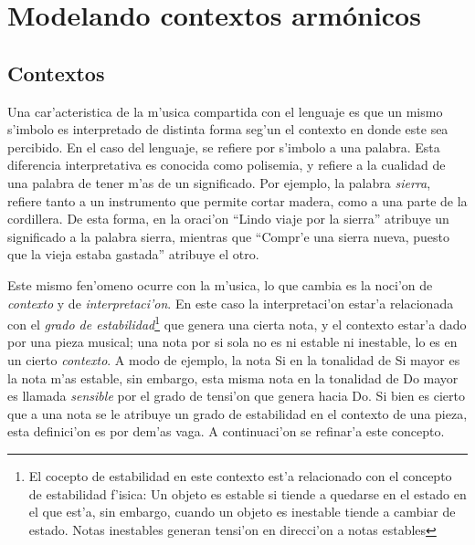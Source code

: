 \pagebreak
\section{Modelando contextos arm\'onicos}
\label{sec:harmonic_contexts}
\subsection{Contextos}
Una car'acteristica de la m'usica compartida con el lenguaje es que un mismo s'imbolo es interpretado de distinta forma seg'un el contexto
en donde este sea percibido. En el caso del lenguaje, se refiere por s'imbolo a una palabra. Esta diferencia interpretativa es conocida 
como polisemia, y refiere a la cualidad de una palabra de tener m'as de un significado. Por ejemplo, la palabra \emph{sierra}, refiere
tanto a un instrumento que permite cortar madera, como a una parte de la cordillera. De esta forma, en la oraci'on 
``Lindo viaje por la sierra'' atribuye un significado a la palabra sierra, mientras que ``Compr'e una sierra nueva, puesto que la vieja 
estaba gastada'' atribuye el otro. 

Este mismo fen'omeno ocurre con la m'usica, lo que cambia es la noci'on de \emph{contexto} y de \emph{interpretaci'on}. En este caso
la interpretaci'on estar'a relacionada con el \emph{grado de estabilidad}\footnote{El cocepto de estabilidad en este contexto est'a relacionado
con el concepto de estabilidad f'isica: Un objeto es estable si tiende a quedarse en el estado en el que est'a, sin embargo, cuando un objeto
es inestable tiende a cambiar de estado. Notas inestables generan tensi'on en direcci'on a notas estables} que genera una cierta nota, 
y el contexto estar'a dado por una pieza musical; una nota por si sola no es ni estable ni inestable, lo es en un cierto \emph{contexto}. 
A modo de ejemplo, la nota Si en la tonalidad de Si mayor es la nota m'as estable, sin embargo, esta misma nota en la tonalidad de Do mayor es llamada
\emph{sensible} por el grado de tensi'on que genera hacia Do.
Si bien es cierto que a una nota se le atribuye un grado de estabilidad en el contexto de una pieza, esta definici'on es por dem'as vaga. 
A continuaci'on se refinar'a este concepto.  

